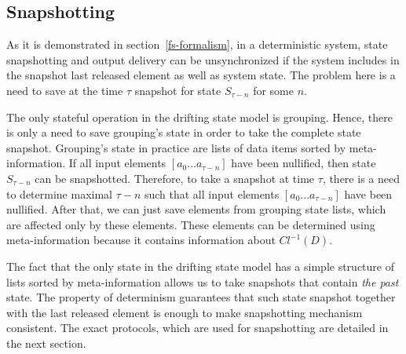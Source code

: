 

\subsection{Snapshotting}

As it is demonstrated in section~\ref{fs-formalism}, in a deterministic system, state snapshotting and output delivery can be unsynchronized if the system includes in the snapshot last released element as well as system state. The problem here is a need to save at the time $\tau$ snapshot for state $S_{\tau-n}$ for some $n$.

The only stateful operation in the drifting state model is grouping. Hence, there is only a need to save grouping's state in order to take the complete state snapshot. Grouping's state in practice are lists of data items sorted by meta-information. If all input elements $[a_{0}...a_{\tau-n}]$ have been nullified, then state $S_{\tau-n}$ can be snapshotted. Therefore, to take a snapshot at time $\tau$, there is a need to determine maximal $\tau-n$ such that all input elements $[a_{0}...a_{\tau-n}]$ have been nullified. After that, we can just save elements from grouping state lists, which are affected only by these elements. These elements can be determined using meta-information because it contains information about $Cl^{-1}(D)$.

The fact that the only state in the drifting state model has a simple structure of lists sorted by meta-information allows us to take snapshots that contain {\em the past} state. The property of determinism guarantees that such state snapshot together with the last released element is enough to make snapshotting mechanism consistent. The exact protocols, which are used for snapshotting are detailed in the next section.  

